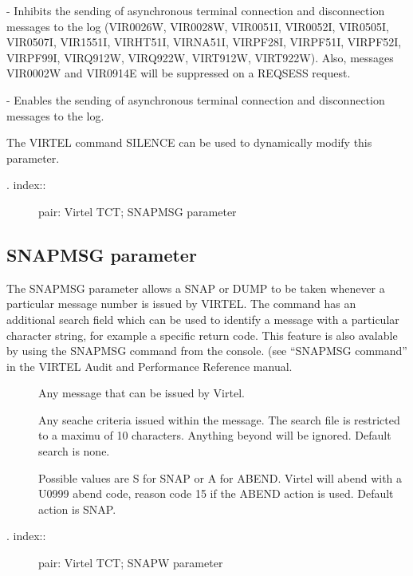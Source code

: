 \documentclass[letterpaper,10pt,english]{sphinxmanual}
\begin{document}
 - Inhibits the sending of asynchronous terminal connection and disconnection messages to the log (VIR0026W, VIR0028W, VIR0051I, VIR0052I, VIR0505I, VIR0507I, VIR1551I, VIRHT51I, VIRNA51I, VIRPF28I, VIRPF51I, VIRPF52I, VIRPF99I, VIRQ912W, VIRQ922W, VIRT912W, VIRT922W). Also, messages VIR0002W and VIR0914E will be suppressed on a REQSESS request.

 - Enables the sending of asynchronous terminal connection and disconnection messages to the log.

The VIRTEL command SILENCE can be used to dynamically modify this parameter.
\begin{description}
\item[{. index::}] \leavevmode
pair: Virtel TCT; SNAPMSG parameter

\end{description}


\subsection{SNAPMSG parameter}
\label{\detokenize{Installation_Guide:snapmsg-parameter}}
\begin{sphinxVerbatim}[commandchars=\\\{\}]
\end{sphinxVerbatim}

The SNAPMSG parameter allows a SNAP or DUMP to be taken whenever a particular message number is issued by VIRTEL. The command has an additional search field which can be used to identify a message with a particular character string, for example a specific return code. This feature is also avalable by using the SNAPMSG command from the console. (see “SNAPMSG command” in the VIRTEL Audit and Performance Reference manual.
\begin{description}
\item[{}] \leavevmode
Any message that can be issued by Virtel.

\item[{}] \leavevmode
Any seache criteria issued within the message. The search file is restricted to a maximu of 10 characters. Anything beyond will be ignored. Default search is none.

\item[{}] \leavevmode
Possible values are S for SNAP or A for ABEND. Virtel will abend with a U0999 abend code, reason code 15 if the ABEND action is used. Default action is SNAP.

\item[{. index::}] \leavevmode
pair: Virtel TCT; SNAPW parameter

\end{description}
\end{document}
